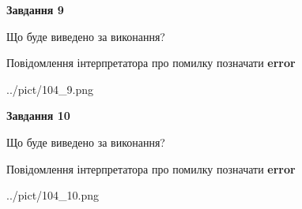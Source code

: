 \documentclass[12pt, ukrainian]{article}
\begin{document}
{{\begin {center}\textbf{Завдання 9}\end {center}}\par
Що буде виведено за виконання? \par
Повідомлення інтерпретатора про помилку позначати \textbf{error}

\begin{center}
	{../pict/104_9.png}
\end{center}
\newpage

{\begin {center}\textbf{Завдання 10}\end {center}}\par
Що буде виведено за виконання? \par
Повідомлення інтерпретатора про помилку позначати \textbf{error}

\begin{center}
	{../pict/104_10.png}
\end{center}
\newpage

}
\end{document}
